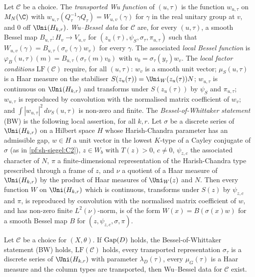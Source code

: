 \begin{definition}\label{pf:sh-siegel:wubdef}
Let $\mathcal C$ be a choice. The \emph{transported Wu function} of $(u,\tau)$ is the function
$w_{u,\tau}$ on $M_N(\C)$ with $w_{u,\tau}(Q_\tau^{-1}\gamma Q_\tau)=W_{u,v}(\gamma)$ for $\gamma$ in the real unitary group at
$v$, and $0$ off $\Uni(H_{k,r})$. \emph{Wu--Bessel data} for $\mathcal C$ are, for every
$(u,\tau)$, a smooth Bessel map $B_{u,\tau}\colon H_v\to V_{u,v}$ for $(z_u(\tau),\psi_S,\sigma_\tau,\pi_{u,\tau})$ such that
$W_{u,v}(\gamma)=B_{u,\tau}(\sigma_v(\gamma)w_v)$ for every $\gamma$. The associated \emph{local Bessel function} is
$\varphi_B(u,\tau)(m)=B_{u,\tau}(\sigma_\tau(m)v_0)$ with $v_0=\sigma_\tau(y_\tau)w_v$. The \emph{local factor conditions}
$\mathrm{LF}(\mathcal C)$ require, for all $(u,\tau)$: $w_v$ is a smooth unit vector; $\mu_S(u,\tau)$ is a Haar measure
on the stabiliser $S(z_u(\tau))=\Uni_W(z_u(\tau))N$; $w_{u,\tau}$ is continuous on $\Uni(H_{k,r})$ and transforms under
$S(z_u(\tau))$ by $\psi_S$ and $\pi_{u,\tau}$; $w_{u,\tau}$ is reproduced by convolution with the normalised matrix
coefficient of $w_v$; and $\int|w_{u,\tau}|^2\,d\nu_S(u,\tau)$ is non-zero and finite.
The \emph{Bessel-of-Whittaker statement} (BW) is the following local assertion, for all $k,r$. Let $\sigma$ be a discrete
series of $\Uni(H_{k,r})$ on a Hilbert space $H$ whose Harish-Chandra parameter has an admissible gap, $w\in H$ a unit vector
in the lowest $K$-type of a Cayley conjugate of $\sigma$ (as in \ref{pf:sh-siegel:C2}), $z\in W_b$ with $T(z)>0$, $c\ne0$,
$\psi_{z,c}$ the associated character of $N$, $\pi$ a finite-dimensional representation of the Harish-Chandra type prescribed
through a frame of $z$, and $\nu$ a quotient of a Haar measure of $\Uni(H_{k,r})$ by
the product of Haar measures of $\Uni_W(z)$ and $N$. Then every function $W$ on $\Uni(H_{k,r})$ which is continuous,
transforms under $S(z)$ by $\psi_{z,c}$ and $\pi$, is reproduced by convolution with the normalised matrix coefficient of
$w$, and has non-zero finite $L^2(\nu)$-norm, is of the form $W(x)=B(\sigma(x)w)$ for a smooth Bessel map $B$ for
$(z,\psi_{z,c},\sigma,\pi)$.
\ \
\end{definition}

\begin{proposition}[Wu--Bessel data from the local factors]\label{pf:sh-siegel:wubessel}
Let $\mathcal C$ be a choice for $(X,\theta)$. If $\mathrm{Gap}(D)$ holds, the Bessel-of-Whittaker statement
(BW) holds, $\mathrm{LF}(\mathcal C)$ holds, every transported representation $\sigma_\tau$ is a discrete
series of $\Uni(H_{k,r})$ with parameter $\lambda_D(\tau)$, every $\mu_G(\tau)$ is a Haar measure and the column types are
transported, then Wu--Bessel data for $\mathcal C$ exist.
\end{proposition}

